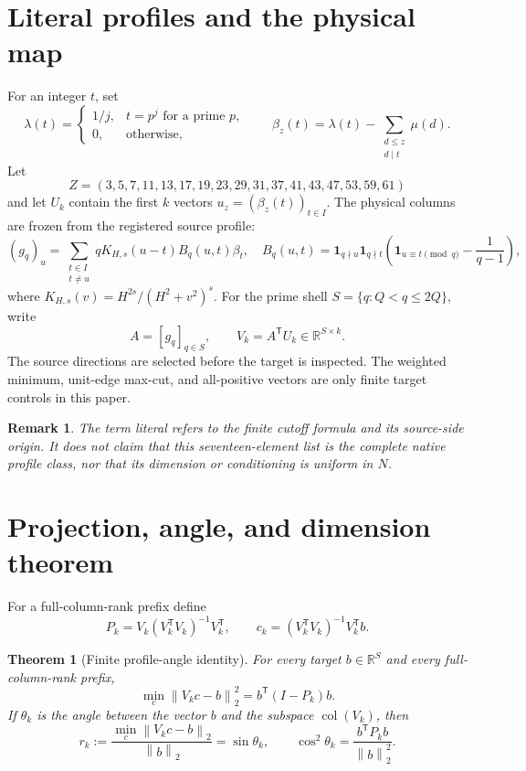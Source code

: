 \documentclass[10pt]{article}
\newtheorem{theorem}{Theorem}
\newtheorem{remark}{Remark}
\newcommand{\R}{\mathbb{R}}
\newcommand{\norm}[1]{\left\lVert #1\right\rVert}
\begin{document}
\section{Literal profiles and the physical map}

For an integer $t$, set
\[
 \lambda(t)=\begin{cases}1/j,&t=p^j\text{ for a prime }p,\\0,&
                         \text{otherwise},\end{cases}\qquad
 \beta_z(t)=\lambda(t)-\sum_{\substack{d\leq z\\d\mid t}}\mu(d).
\]
Let
\[
 Z=(3,5,7,11,13,17,19,23,29,31,37,41,43,47,53,59,61)
\]
and let $U_k$ contain the first $k$ vectors $u_z=(\beta_z(t))_{t\in I}$.
The physical columns are frozen from the registered source profile:
\[
 (g_q)_u=\sum_{\substack{t\in I\\t\ne u}}
 qK_{H,s}(u-t)B_q(u,t)\beta_t,
 \quad
 B_q(u,t)=\mathbf 1_{q\nmid u}\mathbf 1_{q\nmid t}
 \left(\mathbf 1_{u\equiv t\pmod q}-\frac1{q-1}\right),
\]
where $K_{H,s}(v)=H^{2s}/(H^2+v^2)^s$.  For the prime shell
$S=\{q:Q<q\leq2Q\}$, write
\[
 A=[g_q]_{q\in S},\qquad V_k=A^{\mathsf T}U_k\in\R^{S\times k}.
\]
The source directions are selected before the target is inspected.  The
weighted minimum, unit-edge max-cut, and all-positive vectors are only finite
target controls in this paper.

\begin{remark}
The term literal refers to the finite cutoff formula and its source-side
origin.  It does not claim that this seventeen-element list is the complete
native profile class, nor that its dimension or conditioning is uniform in
$N$.
\end{remark}

\section{Projection, angle, and dimension theorem}

For a full-column-rank prefix define
\[
 P_k=V_k(V_k^{\mathsf T}V_k)^{-1}V_k^{\mathsf T},\qquad
 c_k=(V_k^{\mathsf T}V_k)^{-1}V_k^{\mathsf T}b.
\]

\begin{theorem}[Finite profile-angle identity]
For every target $b\in\R^{S}$ and every full-column-rank prefix,
\[
 \min_c\norm{V_kc-b}_2^2=b^{\mathsf T}(I-P_k)b.
\]
If $\theta_k$ is the angle between the vector $b$ and the subspace
$\operatorname{col}(V_k)$, then
\[
 r_k:=\frac{\min_c\norm{V_kc-b}_2}{\norm b_2}=\sin\theta_k,
 \qquad \cos^2\theta_k=\frac{b^{\mathsf T}P_kb}{\norm b_2^2}.
\]
\end{theorem}
\end{document}
